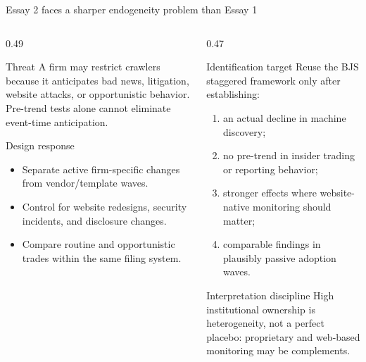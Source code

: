 \documentclass[aspectratio=169,10pt]{beamer}
\newcommand{\tightitems}{\setlength\itemsep{0.11cm}\setlength\parskip{0pt}}
\begin{document}
\begin{frame}[t]{Essay 2 faces a sharper endogeneity problem than Essay 1}
\begin{columns}[T,onlytextwidth]
  \begin{column}{0.49\textwidth}
    \begin{alertblock}{Threat}
    \footnotesize
    A firm may restrict crawlers because it anticipates bad news, litigation, website attacks, or opportunistic behavior. Pre-trend tests alone cannot eliminate event-time anticipation.
    \end{alertblock}
    \begin{block}{Design response}
    \footnotesize
    \begin{itemize}\tightitems
      \item Separate active firm-specific changes from vendor/template waves.
      \item Control for website redesigns, security incidents, and disclosure changes.
      \item Compare routine and opportunistic trades within the same filing system.
    \end{itemize}
    \end{block}
  \end{column}
  \begin{column}{0.47\textwidth}
    \begin{block}{Identification target}
    \small
    Reuse the BJS staggered framework only after establishing:
    \begin{enumerate}\tightitems
      \item an actual decline in machine discovery;
      \item no pre-trend in insider trading or reporting behavior;
      \item stronger effects where website-native monitoring should matter;
      \item comparable findings in plausibly passive adoption waves.
    \end{enumerate}
    \end{block}
    \begin{exampleblock}{Interpretation discipline}
    \scriptsize High institutional ownership is heterogeneity, not a perfect placebo: proprietary and web-based monitoring may be complements.
    \end{exampleblock}
  \end{column}
\end{columns}
\end{frame}
\end{document}
